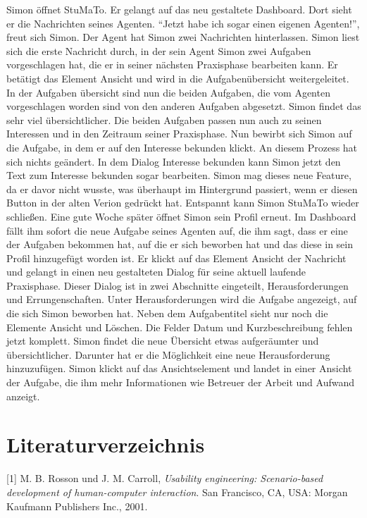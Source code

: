 \documentclass[
  12pt,
  ngerman,
  a4paper,
]{article}
\begin{document}
Simon öffnet StuMaTo. Er gelangt auf das neu gestaltete Dashboard. Dort
sieht er die Nachrichten seines Agenten. ``Jetzt habe ich sogar einen
eigenen Agenten!'', freut sich Simon. Der Agent hat Simon zwei
Nachrichten hinterlassen. Simon liest sich die erste Nachricht durch, in
der sein Agent Simon zwei Aufgaben vorgeschlagen hat, die er in seiner
nächsten Praxisphase bearbeiten kann. Er betätigt das Element Ansicht
und wird in die Aufgabenübersicht weitergeleitet. In der Aufgaben
übersicht sind nun die beiden Aufgaben, die vom Agenten vorgeschlagen
worden sind von den anderen Aufgaben abgesetzt. Simon findet das sehr
viel übersichtlicher. Die beiden Aufgaben passen nun auch zu seinen
Interessen und in den Zeitraum seiner Praxisphase. Nun bewirbt sich
Simon auf die Aufgabe, in dem er auf den Interesse bekunden klickt. An
diesem Prozess hat sich nichts geändert. In dem Dialog Interesse
bekunden kann Simon jetzt den Text zum Interesse bekunden sogar
bearbeiten. Simon mag dieses neue Feature, da er davor nicht wusste, was
überhaupt im Hintergrund passiert, wenn er diesen Button in der alten
Verion gedrückt hat. Entspannt kann Simon StuMaTo wieder schließen. Eine
gute Woche später öffnet Simon sein Profil erneut. Im Dashboard fällt
ihm sofort die neue Aufgabe seines Agenten auf, die ihm sagt, dass er
eine der Aufgaben bekommen hat, auf die er sich beworben hat und das
diese in sein Profil hinzugefügt worden ist. Er klickt auf das Element
Ansicht der Nachricht und gelangt in einen neu gestalteten Dialog für
seine aktuell laufende Praxisphase. Dieser Dialog ist in zwei Abschnitte
eingeteilt, Herausforderungen und Errungenschaften. Unter
Herausforderungen wird die Aufgabe angezeigt, auf die sich Simon
beworben hat. Neben dem Aufgabentitel sieht nur noch die Elemente
Ansicht und Löschen. Die Felder Datum und Kurzbeschreibung fehlen jetzt
komplett. Simon findet die neue Übersicht etwas aufgeräumter und
übersichtlicher. Darunter hat er die Möglichkeit eine neue
Herausforderung hinzuzufügen. Simon klickt auf das Ansichtselement und
landet in einer Ansicht der Aufgabe, die ihm mehr Informationen wie
Betreuer der Arbeit und Aufwand anzeigt.

\pagebreak
{}
\setcounter{page}{4}

\section*{Literaturverzeichnis}

\hypertarget{refs}{}
\leavevmode\hypertarget{ref-sbd}{}%
{[}1{]} M. B. Rosson und J. M. Carroll, \emph{Usability engineering:
Scenario-based development of human-computer interaction}. San
Francisco, CA, USA: Morgan Kaufmann Publishers Inc., 2001.
\end{document}
